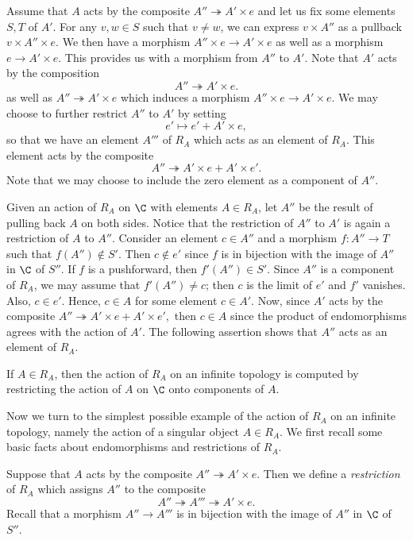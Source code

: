 \documentclass[a4paper,reqno,oneside]{article}
\begin{document}
Assume that $A$ acts by the composite $A'' \twoheadrightarrow A' \times e$ and let us fix some elements $S,T$ of $A'$.  For any $v,w \in S$ such that $v \neq w$, we can express $v \times A''$ as a pullback $v \times A'' \times e$.  We then have a morphism $A'' \times e \to A' \times e$ as well as a morphism $e \to A' \times e$.  This provides us with a morphism from $A''$ to $A'$.  Note that $A'$ acts by the composition 
$$
A'' \twoheadrightarrow A' \times e.
$$
as well as $A'' \twoheadrightarrow A' \times e$ which induces a morphism $A'' \times e \to A' \times e$.  We may choose to further restrict $A''$ to $A'$ by setting 
$$
e' \mapsto e' + A' \times e,
$$
so that we have an element $A'''$ of $R_A$ which acts as an element of $R_A$.  This element acts by the composite
$$
A'' \twoheadrightarrow A' \times e + A' \times e'.
$$
Note that we may choose to include the zero element as a component of $A''$.

Given an action of $R_A$ on $\C$ with elements $A \in R_A$, let $A''$ be the result of pulling back $A$ on both sides.  Notice that the restriction of $A''$ to $A'$ is again a restriction of $A$ to $A''$.  Consider an element $c \in A''$ and a morphism $f: A'' \to T$ such that $f(A'') \notin S'$.  Then $c \notin e'$ since $f$ is in bijection with the image of $A''$ in $\C$ of $S''$.  If $f$ is a pushforward, then $f'(A'') \in S'$.  Since $A''$ is a component of $R_A$, we may assume that $f'(A'') \neq c$; then $c$ is the limit of $e'$ and $f'$ vanishes.  Also, $c \in e'$.  Hence, $c \in A$ for some element $c \in A'$.  Now, since $A'$ acts by the composite $A'' \twoheadrightarrow A' \times e + A' \times e',$ then $c \in A$ since the product of endomorphisms agrees with the action of $A'$.  The following assertion shows that $A''$ acts as an element of $R_A$.

\begin{theorem}
    If $A \in R_A$, then the action of $R_A$ on an infinite topology is computed by restricting the action of $A$ on $\C$ onto components of $A$.
\end{theorem}

Now we turn to the simplest possible example of the action of $R_A$ on an infinite topology, namely the action of a singular object $A \in R_A$.  We first recall some basic facts about endomorphisms and restrictions of $R_A$.

\begin{definition}
    Suppose that $A$ acts by the composite $A'' \twoheadrightarrow A' \times e$. Then we define a \textit{restriction} of $R_A$ which assigns $A''$ to the composite
    $$
    A'' \twoheadrightarrow A''' \twoheadrightarrow A' \times e.
    $$
    Recall that a morphism $A'' \to A'''$ is in bijection with the image of $A''$ in $\C$ of $S''$.
\end{definition}
\end{document}

